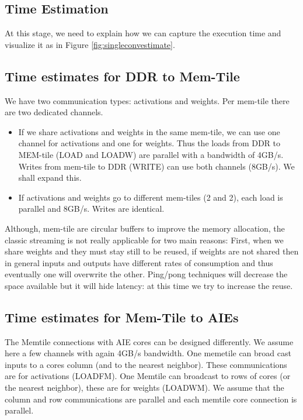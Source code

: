 \documentclass[sigconf]{acmart}
\begin{document}
\subsection{Time Estimation}
At this stage, we need to explain how we can capture the execution
time and visualize it as in Figure \ref{fig:singleconvestimate}. %

\subsection{Time estimates for DDR to Mem-Tile}
We have two communication types: activations and weights. Per
mem-tile there are two dedicated channels.
\begin{itemize}
 \item If we share activations and weights in the same mem-tile, we
   can use one channel for activations and one for weights. Thus the
   loads from DDR to MEM-tile (LOAD and LOADW) are parallel with a
   bandwidth of 4GB/s. Writes from mem-tile to DDR (WRITE) can use
   both channels (8GB/s). We shall expand this.

 \item If activations and weights go to different mem-tiles (2 and 2),
   each load is parallel and 8GB/s. Writes
   are identical.
\end{itemize}
Although, mem-tile are circular buffers to improve the memory
allocation, the classic streaming is not really applicable for two
main reasons: First, when we share weights and they must stay still to
be reused, if weights are not shared then in general inputs and
outputs have different rates of consumption and thus eventually one
will overwrite the other. Ping/pong techniques will decrease the space
available but it will hide latency: at this time we try to increase
the reuse.
   
\subsection{Time estimates for Mem-Tile to AIEs}

The Memtile connections with AIE cores can be designed differently. We
assume here a few channels with again 4GB/s bandwidth. One memetile
can broad cast inputs to a cores column (and to the nearest
neighbor). These communications are for activations (LOADFM). One
Memtile can broadcast to rows of cores (or the nearest neighbor),
these are for weights (LOADWM). We assume that the column and row
communications are parallel and each memtile core connection is
parallel.
\end{document}
